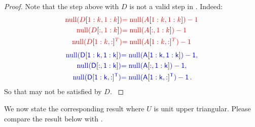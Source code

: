 \documentclass[10pt,twoside]{siamart1116}
\DeclareMathOperator{\nl}{null}
\numberwithin{theorem}{section}
\providecommand{\DIFadd}[1]{{\protect\color{blue} \sf #1}} %
\providecommand{\DIFdel}[1]{{\protect\color{red} \scriptsize #1}} %
\providecommand{\DIFaddbegin}{} %
\providecommand{\DIFaddend}{} %
\providecommand{\DIFdelbegin}{} %
\providecommand{\DIFdelend}{} %
\begin{document}
\begin{proof}
  Note that the step above with $D$ is not a valid step in . Indeed:
  \DIFdelbegin \begin{align*}
		\DIFdel{\nl(D}[\DIFdel{1:k,1:k}]\DIFdel{)   }& \DIFdel{= \nl(A}[\DIFdel{1:k,1:k}]\DIFdel{) - 1 }\\
		\DIFdel{\nl(D}[\DIFdel{:,1:k}]\DIFdel{)     }& \DIFdel{= \nl(A}[\DIFdel{:,1:k}]\DIFdel{) - 1 }\\
		\DIFdel{\nl(}{\DIFdel{D}[\DIFdel{1:k,:}]}\DIFdel{^T) }& \DIFdel{= \nl(}{\DIFdel{A}[\DIFdel{1:k,:}]}\DIFdel{^T) - 1
	}\end{align*}%
\DIFdelend \DIFaddbegin \begin{align*}
    \DIFadd{\nl(D}[\DIFadd{1:k,1:k}]\DIFadd{)   }& \DIFadd{= \nl(A}[\DIFadd{1:k,1:k}]\DIFadd{) - 1, }\\
    \DIFadd{\nl(D}[\DIFadd{:,1:k}]\DIFadd{)     }& \DIFadd{= \nl(A}[\DIFadd{:,1:k}]\DIFadd{) - 1, }\\
    \DIFadd{\nl(}{\DIFadd{D}[\DIFadd{1:k,:}]}\DIFadd{^T) }& \DIFadd{= \nl(}{\DIFadd{A}[\DIFadd{1:k,:}]}\DIFadd{^T) - 1 \,.
  }\end{align*}\DIFaddend 
\DIFdelbegin \DIFdel{So that }%
\DIFdel{may not be satisfied by $D$.
}\DIFdelend \end{proof}

We now state the corresponding result where $U$ is unit upper triangular. Please compare the result below with .
\end{document}
